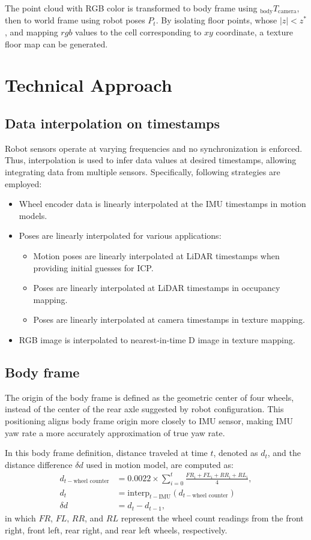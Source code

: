 \documentclass[conference]{IEEEtran}
\begin{document}
The point cloud with RGB color is 
transformed to body frame using $_{\text{body}}T_{\text{camera}}$,
then to world frame using robot poses $P_t$.
By isolating floor points, whose $|z| < z^*$,
and mapping $rgb$ values to the cell corresponding to $xy$ coordinate,
a texture floor map can be generated.

\section{Technical Approach}

\subsection{Data interpolation on timestamps}
Robot sensors operate at varying frequencies and no synchronization is enforced. 
Thus, interpolation is used to infer data values at desired timestamps,
allowing integrating data from multiple sensors.
Specifically, following strategies are employed:
\begin{itemize}
\item Wheel encoder data is linearly interpolated at the IMU timestamps in motion models. 
\item Poses are linearly interpolated for various applications:
\begin{itemize}
\item Motion poses are linearly interpolated at LiDAR timestamps when providing initial guesses for ICP.
\item Poses are linearly interpolated at LiDAR timestamps in occupancy mapping.
\item Poses are linearly interpolated at camera timestamps in texture mapping.
\end{itemize}
\item RGB image is interpolated to nearest-in-time D image in texture mapping.
\end{itemize}


\subsection{Body frame}
The origin of the body frame is defined as the geometric center of four wheels, 
instead of the center of the rear axle suggested by robot configuration. 
This positioning aligns body frame origin more closely to IMU sensor, 
making IMU yaw rate a more accurately approximation of true yaw rate.

In this body frame definition, distance traveled at time $t$, 
denoted as $d_t$, and the distance difference $\delta d$ used in motion model, 
are computed as:
$$
\begin{aligned}
d_{t-\text{wheel counter}} &= 0.0022 \times \sum_{i=0}^{t} \frac{FR_i + FL_i + RR_i + RL_i}{4}, \\
d_{t} &= \text{interp}_{t-\text{IMU}}(d_{t-\text{wheel counter}})\\
\delta d &= d_{t} - d_{t-1},
\end{aligned}
$$
in which $FR$, $FL$, $RR$, and $RL$ represent the wheel count readings 
from the front right, front left, rear right, and rear left wheels, respectively.
\end{document}
